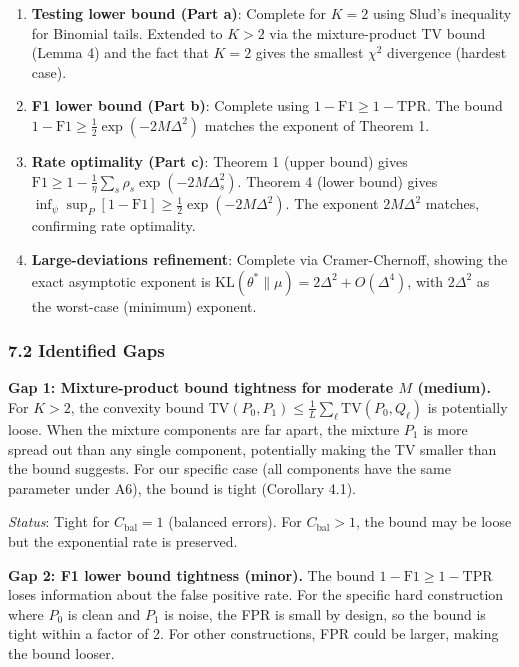 \documentclass[
  12pt,
]{ctexart}
\begin{document}
\begin{enumerate}
\def\labelenumi{\arabic{enumi}.}
\item
  \textbf{Testing lower bound (Part a)}: Complete for \(K=2\) using
  Slud's inequality for Binomial tails. Extended to \(K>2\) via the
  mixture-product TV bound (Lemma 4) and the fact that \(K=2\) gives the
  smallest \(\chi^2\) divergence (hardest case).
\item
  \textbf{F1 lower bound (Part b)}: Complete using
  \(1-\text{F1} \geq 1-\text{TPR}\). The bound
  \(1-\text{F1} \geq \frac{1}{2}\exp(-2M\Delta^2)\) matches the exponent
  of Theorem 1.
\item
  \textbf{Rate optimality (Part c)}: Theorem 1 (upper bound) gives
  \(\text{F1} \geq 1 - \frac{1}{\eta}\sum_s\rho_s\exp(-2M\Delta_s^2)\).
  Theorem 4 (lower bound) gives
  \(\inf_\psi\sup_P[1-\text{F1}] \geq \frac{1}{2}\exp(-2M\Delta^2)\).
  The exponent \(2M\Delta^2\) matches, confirming rate optimality.
\item
  \textbf{Large-deviations refinement}: Complete via Cramer-Chernoff,
  showing the exact asymptotic exponent is
  \(\text{KL}(\theta^* \parallel \mu) = 2\Delta^2 + O(\Delta^4)\), with
  \(2\Delta^2\) as the worst-case (minimum) exponent.
\end{enumerate}

\subsubsection{7.2 Identified Gaps}\label{identified-gaps}

\textbf{Gap 1: Mixture-product bound tightness for moderate \(M\)
(medium).} For \(K > 2\), the convexity bound
\(\text{TV}(P_0, P_1) \leq \frac{1}{L}\sum_\ell \text{TV}(P_0, Q_\ell)\)
is potentially loose. When the mixture components are far apart, the
mixture \(P_1\) is more spread out than any single component,
potentially making the TV smaller than the bound suggests. For our
specific case (all components have the same parameter under A6), the
bound is tight (Corollary 4.1).

\emph{Status}: Tight for \(C_{\text{bal}} = 1\) (balanced errors). For
\(C_{\text{bal}} > 1\), the bound may be loose but the exponential rate
is preserved.

\textbf{Gap 2: F1 lower bound tightness (minor).} The bound
\(1-\text{F1} \geq 1-\text{TPR}\) loses information about the false
positive rate. For the specific hard construction where \(P_0\) is clean
and \(P_1\) is noise, the FPR is small by design, so the bound is tight
within a factor of 2. For other constructions, FPR could be larger,
making the bound looser.
\end{document}
